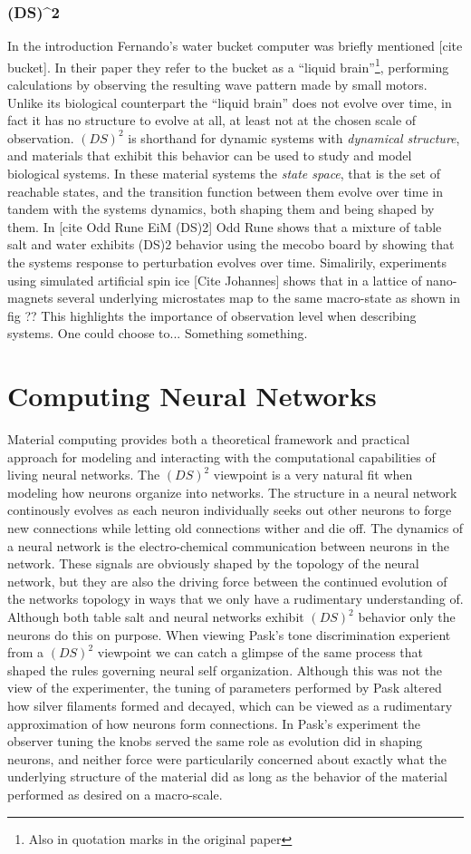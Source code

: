 \subsubsection{(DS)^2}
%
In the introduction Fernando's water bucket computer was briefly mentioned [cite
bucket].
In their paper they refer to the bucket as a ``liquid brain''\footnote{Also in
  quotation marks in the original paper}, performing calculations by observing
the resulting wave pattern made by small motors.
Unlike its biological counterpart the ``liquid brain'' does not evolve over
time, in fact it has no structure to evolve at all, at least not at the chosen
scale of observation.
%
$(DS)^2$ is shorthand for dynamic systems with \emph{dynamical structure}, and
materials that exhibit this behavior can be used to study and model biological
systems.
In these material systems the \emph{state space}, that is the set of reachable
states, and the transition function between them evolve over time in tandem with
the systems dynamics, both shaping them and being shaped by them.
%
In [cite Odd Rune EiM (DS)2] Odd Rune shows that a mixture of table salt and
water exhibits (DS)2 behavior using the mecobo board by showing that the systems
response to perturbation evolves over time.
%
Simalirily, experiments using simulated artificial spin ice [Cite Johannes]
shows that in a lattice of nano-magnets several underlying microstates map to the
same macro-state as shown in fig ??
This highlights the importance of observation level when describing systems.
One could choose to... Something something.
\section{Computing Neural Networks}
Material computing provides both a theoretical framework and practical
approach for modeling and interacting with the computational capabilities of
living neural networks.
%
The $(DS)^2$ viewpoint is a very natural fit when modeling how neurons organize
into networks.
The structure in a neural network continously evolves as each neuron
individually seeks out other neurons to forge new connections while letting old
connections wither and die off.
The dynamics of a neural network is the electro-chemical communication between
neurons in the network.
These signals are obviously shaped by the topology of the neural network, but
they are also the driving force between the continued evolution of the networks
topology in ways that we only have a rudimentary understanding of.
%
Although both table salt and neural networks exhibit $(DS)^2$ behavior only the
neurons do this on purpose.
When viewing Pask's tone discrimination experient from a $(DS)^2$ viewpoint we
can catch a glimpse of the same process that shaped the rules governing neural
self organization.
Although this was not the view of the experimenter, the tuning of parameters
performed by Pask altered how silver filaments formed and decayed, which can be
viewed as a rudimentary approximation of how neurons form connections.
%
In Pask's experiment the observer tuning the knobs served the same role as
evolution did in shaping neurons, and neither force were particularily concerned
about exactly what the underlying structure of the material did as long as the
behavior of the material performed as desired on a macro-scale.
%
